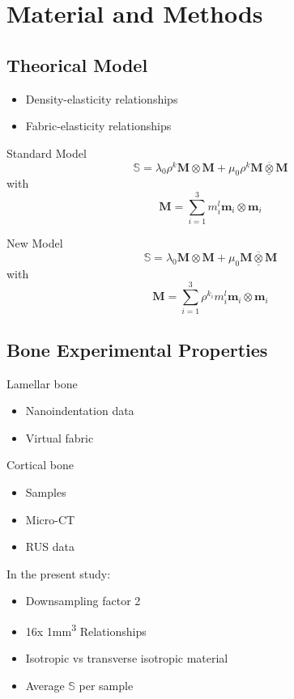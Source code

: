 \documentclass[a4paper,fleqn]{DC_ArtStyle}
\begin{document}
	
	\newpage
	\section{Material and Methods}
	\subsection{Theorical Model}
	\begin{itemize}
		\item Density-elasticity relationships
		\item Fabric-elasticity relationships
	\end{itemize}

	Standard Model
	\begin{equation}
		\mathbb{S} = \lambda_0 \rho^k \mathbf{M} \otimes \mathbf{M} + \mu_0 \rho^k \mathbf{M} \underline{\overline{\otimes}}  \mathbf{M}
	\end{equation}
	with
	\begin{equation}
		\mathbf{M} = \sum_{i=1}^{3} m_i^l \mathbf{m}_i \otimes \mathbf{m}_i
	\end{equation}

	New Model
	\begin{equation}
		\mathbb{S} = \lambda_0 \mathbf{M} \otimes \mathbf{M} + \mu_0 \mathbf{M} \underline{\overline{\otimes}} \mathbf{M}
	\end{equation}
	with
	\begin{equation}
		\mathbf{M} = \sum_{i=1}^{3} \rho^{k_i} m_i^l \mathbf{m}_i \otimes \mathbf{m}_i
	\end{equation}

	\subsection{Bone Experimental Properties}
	Lamellar bone
	\begin{itemize}
		\item Nanoindentation data
		\item Virtual fabric
	\end{itemize}

	Cortical bone
	\begin{itemize}
		\item Samples
		\item Micro-CT
		\item RUS data
	\end{itemize}
	In the present study:
	\begin{itemize}
		\item Downsampling factor 2
		\item 16x 1mm\textsuperscript{3} Relationships
		\item Isotropic vs transverse isotropic material
		\item Average $\mathbb{S}$ per sample
	\end{itemize}
	
\end{document}
